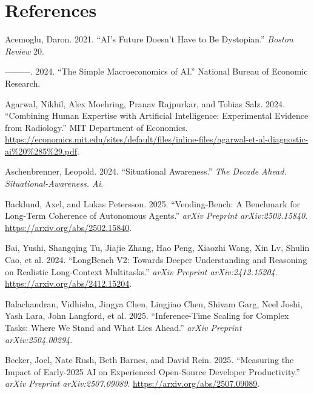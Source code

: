 \documentclass[
  letterpaper,
  DIV=11,
  numbers=noendperiod,
  oneside]{scrartcl}
\newlength{\cslhangindent}
\newenvironment{CSLReferences}[2] %
 {\begin{list}{}{%
  \setlength{\itemindent}{0pt}
  \setlength{\leftmargin}{0pt}
  \setlength{\parsep}{0pt}
  \ifodd #1
   \setlength{\leftmargin}{\cslhangindent}
   \setlength{\itemindent}{-1\cslhangindent}
  \fi
  \setlength{\itemsep}{#2\baselineskip}}}
 {\end{list}}
\begin{document}
\section*{References}\label{references}

\label{refs}
\begin{CSLReferences}{1}{0}
Acemoglu, Daron. 2021. {``AI's Future Doesn't Have to Be Dystopian.''}
\emph{Boston Review} 20.

---------. 2024. {``The Simple Macroeconomics of AI.''} National Bureau
of Economic Research.

Agarwal, Nikhil, Alex Moehring, Pranav Rajpurkar, and Tobias Salz. 2024.
{``Combining Human Expertise with Artificial Intelligence: Experimental
Evidence from Radiology.''} MIT Department of Economics.
\url{https://economics.mit.edu/sites/default/files/inline-files/agarwal-et-al-diagnostic-ai\%20\%285\%29.pdf}.

Aschenbrenner, Leopold. 2024. {``Situational Awareness.''} \emph{The
Decade Ahead. Situational-Awareness. Ai}.

Backlund, Axel, and Lukas Petersson. 2025. {``Vending-Bench: A Benchmark
for Long-Term Coherence of Autonomous Agents.''} \emph{arXiv Preprint
arXiv:2502.15840}. \url{https://arxiv.org/abs/2502.15840}.

Bai, Yushi, Shangqing Tu, Jiajie Zhang, Hao Peng, Xiaozhi Wang, Xin Lv,
Shulin Cao, et al. 2024. {``LongBench V2: Towards Deeper Understanding
and Reasoning on Realistic Long-Context Multitasks.''} \emph{arXiv
Preprint arXiv:2412.15204}. \url{https://arxiv.org/abs/2412.15204}.

Balachandran, Vidhisha, Jingya Chen, Lingjiao Chen, Shivam Garg, Neel
Joshi, Yash Lara, John Langford, et al. 2025. {``Inference-Time Scaling
for Complex Tasks: Where We Stand and What Lies Ahead.''} \emph{arXiv
Preprint arXiv:2504.00294}.

Becker, Joel, Nate Rush, Beth Barnes, and David Rein. 2025. {``Measuring
the Impact of Early-2025 AI on Experienced Open-Source Developer
Productivity.''} \emph{arXiv Preprint arXiv:2507.09089}.
\url{https://arxiv.org/abs/2507.09089}.


\end{CSLReferences}
\end{document}
